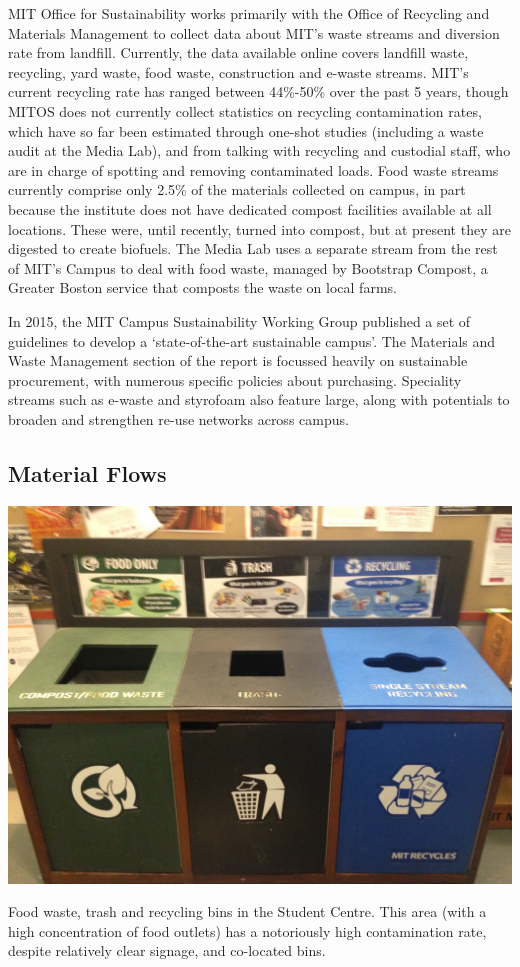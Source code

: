\documentclass[nofonts,nols,justified,nobib]{tufte-book}
\begin{document}
MIT Office for Sustainability works primarily with the Office of Recycling and Materials Management to collect data about MIT's waste streams and diversion rate from landfill. Currently, the data available online covers landfill waste, recycling, yard waste, food waste, construction and e-waste streams. MIT's current recycling rate has ranged between 44\%-50\% over the past 5 years, though MITOS does not currently collect statistics on recycling contamination rates, which have so far been estimated through one-shot studies (including a waste audit at the Media Lab), and from talking with recycling and custodial staff, who are in charge of spotting and removing contaminated loads. Food waste streams currently comprise only 2.5\% of the materials collected on campus, in part because the institute does not have dedicated compost facilities available at all locations. These were, until recently, turned into compost, but at present they are digested to create biofuels. The Media Lab uses a separate stream from the rest of MIT's Campus to deal with food waste, managed by Bootstrap Compost, a Greater Boston service that composts the waste on local farms.

In 2015, the MIT Campus Sustainability Working Group published a set of guidelines to develop a `state-of-the-art sustainable campus'. The Materials and Waste Management section of the report is focussed heavily on sustainable procurement, with numerous specific policies about purchasing. Speciality streams such as e-waste and styrofoam also feature large, along with potentials to broaden and strengthen re-use networks across campus.

\subsection*{Material Flows}

\begin{marginfigure}
\includegraphics[width=\textwidth]{img/2/mit-bins/trash6}
\caption{Food waste, trash and recycling bins in the Student Centre. This area (with a high concentration of food outlets) has a notoriously high contamination rate, despite relatively clear signage, and co-located bins.}
\end{marginfigure}
\end{document}
